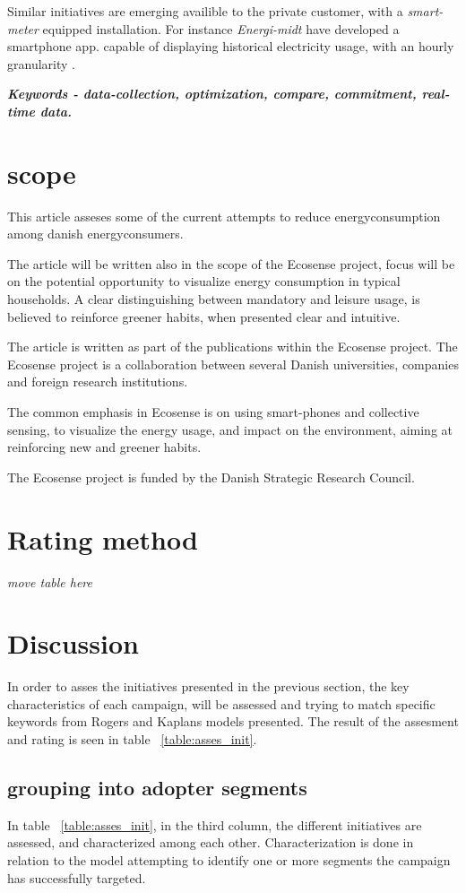 \documentclass[journal]{IEEEtran}
\begin{document}
Similar initiatives are emerging availible to the private customer, with a \textit{smart-meter} equipped installation. For instance \textit{Energi-midt} have developed a smartphone app. capable of displaying historical electricity usage, with an hourly granularity \cite{em_app}. \newline

\textbf{\textit{Keywords - data-collection, optimization, compare, commitment, real-time data.}}

\section{scope}
This article asseses some of the current attempts to reduce energyconsumption among danish energyconsumers.

The article will be written also in the scope of the Ecosense project, focus will be on the potential opportunity to visualize energy consumption in typical households. A clear distinguishing between mandatory and leisure usage, is believed to reinforce greener habits, when presented clear and intuitive.

The article is written as part of the publications within the Ecosense project. The Ecosense project is a collaboration between several Danish universities, companies and foreign research institutions. 

The common emphasis in Ecosense is on using smart-phones and collective sensing, to visualize the energy usage, and impact on the environment, aiming at reinforcing new and greener habits. 

The Ecosense project is funded by the Danish Strategic Research Council.

\section{Rating method}
\textit{move table here}

\section{Discussion}
In order to asses the initiatives presented in the previous section, the key characteristics of each campaign, will be assessed and trying to match specific keywords from Rogers and Kaplans models presented.
The result of the assesment and rating is seen in table ~\ref{table:asses_init}.

\subsection{grouping into adopter segments}
In table ~\ref{table:asses_init}, in the third column, the different initiatives are assessed, and characterized among each other. Characterization is done in relation to the model attempting to identify one or more segments the campaign has successfully targeted. 
\end{document}
